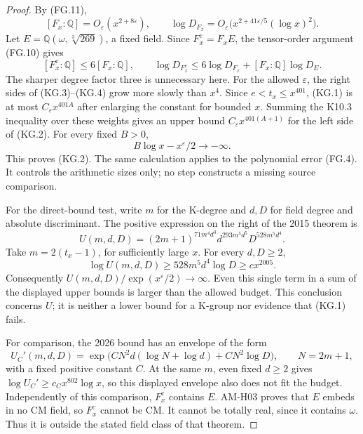 \begin{proof}
By (FG.11),
\[
 [F_x:\mathbb Q]=O_\varepsilon(x^{2+8\varepsilon}),\qquad
 \log D_{F_x}
 =O_\varepsilon\bigl(x^{2+41\varepsilon/5}(\log x)^2\bigr).
                                                               \tag{KG.3}
\]
Let $E=\mathbb Q(\omega,\sqrt[3]{269})$, a fixed field.
Since $F_x^{\mathrm c}=F_xE$, the tensor-order argument
(FG.10) gives
\[
 [F_x^{\mathrm c}:\mathbb Q]\leq6[F_x:\mathbb Q],\qquad
 \log D_{F_x^{\mathrm c}}
 \leq6\log D_{F_x}+[F_x:\mathbb Q]\log D_E.          \tag{KG.4}
\]
The sharper degree factor three is unnecessary here.
For the allowed $\varepsilon$, the right sides of (KG.3)--(KG.4)
grow more slowly than $x^4$.  Since $e<t_x\leq x^{401}$,
(KG.1) is at most $C_\varepsilon x^{401A}$ after enlarging
the constant for bounded $x$.  Summing the K10.3 inequality
over these weights gives an upper bound
$C_\varepsilon x^{401(A+1)}$ for the left side of (KG.2).
For every fixed $B>0$,
\[
       B\log x-x^\varepsilon/2\longrightarrow-\infty.
\]
This proves (KG.2).  The same calculation applies to the
polynomial error (FG.4).  It controls the arithmetic sizes
only; no step constructs a missing source comparison.

For the direct-bound test, write $m$ for the K-degree and
$d,D$ for field degree and absolute discriminant.  The
positive expression on the right of the 2015 theorem is
\[
 U(m,d,D)=(2m+1)^{71m^4d^3}
               d^{293m^5d^5}D^{528m^5d^4}.          \tag{KG.5}
\]
Take $m=2(t_x-1)$, for sufficiently large $x$.
For every $d,D\geq2$,
\[
 \log U(m,d,D)\geq528m^5d^4\log D\geq c x^{2005}.
\]
Consequently $U(m,d,D)/\exp(x^\varepsilon/2)\to\infty$.
Even this single term in a sum of the displayed upper bounds
is larger than the allowed budget.  This conclusion concerns
$U$; it is neither a lower bound for a K-group nor evidence
that (KG.1) fails.

For comparison, the 2026 bound has an envelope of the form
\[
 U_C'(m,d,D)=
 \exp\!\bigl(CN^2d(\log N+\log d)+CN^2\log D\bigr),
          \qquad N=2m+1,                            \tag{KG.6}
\]
with a fixed positive constant $C$.  At the same $m$,
even fixed $d\geq2$ gives
$\log U_C'\geq c_C x^{802}\log x$, so this displayed
envelope also does not fit the budget.  Independently of
this comparison, $F_x^{\mathrm c}$ contains $E$.
AM-H03 proves that $E$ embeds in no CM field, so
$F_x^{\mathrm c}$ cannot be CM.  It cannot be totally real,
since it contains $\omega$.  Thus it is outside the stated
field class of that theorem.
\end{proof}

